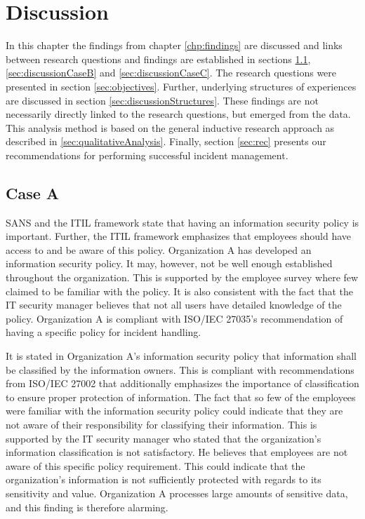 \chapter{Discussion}
\label{chp:discussion}
In this chapter the findings from chapter \ref{chp:findings} are discussed and links between research questions and findings are established in sections \ref{sec:discussionCaseA}, \ref{sec:discussionCaseB} and \ref{sec:discussionCaseC}. The research questions were presented in section \ref{sec:objectives}. Further, underlying structures of experiences  are discussed in section \ref{sec:discussionStructures}. These findings are not necessarily  directly linked to the research questions, but emerged from the data. This analysis method is based on the general inductive research approach as described in \ref{sec:qualitativeAnalysis}. Finally, section \ref{sec:rec} presents our recommendations for performing successful incident management.  

\section{Case A}
\label{sec:discussionCaseA}
SANS and the \acs{ITIL} framework state that having an information security policy is important. Further, the \acs{ITIL} framework emphasizes that employees should have access to and be aware of this policy. Organization A has developed an information security policy. It may, however, not be well enough established throughout the organization. This is supported by the employee survey where few claimed to be familiar with the policy. It is also consistent with the fact that the IT security manager believes that not all users have detailed knowledge of the policy. Organization A is compliant with ISO/IEC 27035's recommendation of having a specific policy for incident handling. 

It is stated in Organization A's information security policy that information shall be classified by the information owners. This is compliant with recommendations from ISO/IEC 27002 that additionally emphasizes the importance of classification to ensure proper protection of information. The fact that so few of the employees were familiar with the information security policy could indicate that they are not aware of their responsibility for classifying their information. This is supported by the IT security manager who stated that the organization's information classification is not satisfactory. He believes that employees are not aware of this specific policy requirement. This could indicate that the organization's information is not sufficiently protected with regards to its sensitivity and value. Organization A processes large amounts of sensitive data, and this finding is therefore alarming.

